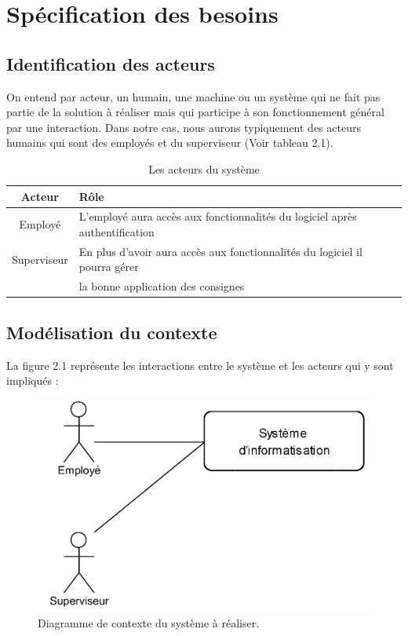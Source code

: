 \pagestyle{fancy}
\chead{}
\rhead{}
\lfoot{}
\cfoot{\thepage}
\rfoot{}

\section{Spécification des besoins}
	\subsection{Identification des acteurs}
	On entend par acteur, un humain, une machine ou un système qui ne fait pas partie de la solution à réaliser mais qui participe à son fonctionnement général par une interaction. Dans notre cas, nous aurons typiquement des acteurs humains qui sont des employés et du superviseur (Voir tableau 2.1).
	
\begin{table}[!ht]

		\begin{tabular}{|c|l|}
		\hline
		\textbf{Acteur} & \textbf{Rôle} \\
		\hline
		Employé & L'employé aura accès aux fonctionnalités du logiciel après authentification\\
		\hline
		Superviseur & En plus d'avoir aura accès aux fonctionnalités du logiciel il pourra gérer\\
		& la bonne application des consignes\\
		\hline
		\end{tabular}
		\caption{Les acteurs du système}
	\end{table}
	
	\subsection{Modélisation du contexte}
	La figure 2.1 représente les interactions entre le système et les acteurs qui y sont impliqués :
	
	\begin{figure}[!h]
		\center
			\includegraphics[scale=1.2]{images/DC}
			\caption{Diagramme de contexte du système à réaliser.}
	\end{figure}
	
